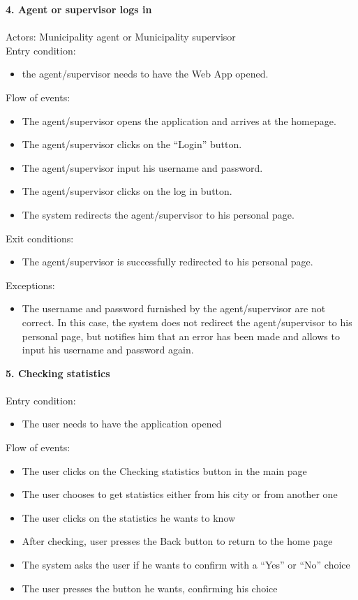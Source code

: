 \documentclass[a4paper]{report}
\begin{document}
\textbf{4. Agent or supervisor logs in }
\\
\\
Actors: Municipality agent or Municipality supervisor \\
Entry condition:
\begin{itemize}
\item the agent/supervisor needs to have the Web App opened.
\end{itemize}
Flow of events:
\begin{itemize}
\item The agent/supervisor opens the application and arrives at the homepage.
\item The agent/supervisor clicks on the “Login” button.
\item The agent/supervisor input his username and password.
\item	The agent/supervisor clicks on the log in button.
\item	The system redirects the agent/supervisor to his personal page.
\end{itemize}
Exit conditions:
\begin{itemize}
\item The agent/supervisor is successfully redirected to his personal page.
 \end{itemize}
Exceptions: 
 \begin{itemize}
 \item The username and password furnished by the agent/supervisor are not correct. In this case, the system does not redirect the agent/supervisor to his personal page, but notifies him that an error has been made and allows to input his username and password again.
\end{itemize}
\textbf{5. Checking statistics}
\\ \\
Entry condition: 
\begin{itemize}
\item The user needs to have the application opened
\end{itemize}
Flow of events:
\begin{itemize}
\item The user clicks on the Checking statistics button in the main page
\item The user chooses to get statistics either from his city or from another one
\item The user clicks on the statistics he wants to know 
\item After checking, user presses the Back button to return to the home page
\item The system asks the user if he wants to confirm with a “Yes” or “No” choice
\item The user presses the button he wants, confirming his choice
\end{itemize}
\end{document}
